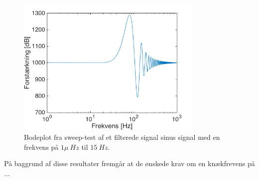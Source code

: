 \begin{figure}[H]
\centering
\includegraphics[width=0.8\textwidth]{figures/bodeplot_lavpas}
\caption{Bodeplot fra sweep-test af et filterede signal sinus signal med en frekvens på $1\mu~Hz$ til $15~Hz$.}
\label{fig:lavps_sweep}
\end{figure}

På baggrund af disse resultater fremgår at de ønskede krav om en knækfrevens på ...


